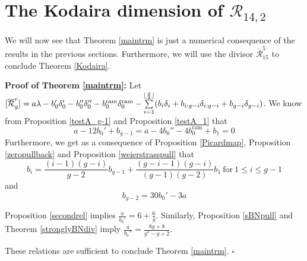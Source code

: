\documentclass{article}
\DeclarePairedDelimiter\floor{\lfloor}{\rfloor}
\theoremstyle{plain}
\newtheorem{cor}[trm]{Corollary}
\theoremstyle{definition}
\def\cM{\mathcal{M}}
\def\cR{\mathcal{R}}
\def\rr{\overline{\mathcal{R}}}
\begin{document}


\section{The Kodaira dimension of $\cR_{14,2}$} 

We will now see that Theorem \ref{maintrm} is just a numerical consequence of the results in the previous sections. Furthermore, we will use the divisor $\rr^5_{15}$ to conclude Theorem \ref{Kodaira}. 

\textbf{Proof of Theorem \ref{maintrm}:}
Let $[\rr^r_g] = a\lambda - b_0'\delta_0'- b_0''\delta_0''-b_0^{\mathrm{ram}}\delta_0^{\mathrm{ram}} - \sum\limits_{i=1}^{\floor{\frac{g}{2}}} (b_i\delta_i + b_{i:g-i} \delta_{i:g-i} + b_{g-i}\delta_{g-i})$. We know from Proposition \ref{testA_g-1} and Proposition \ref{testA_1} that
\[ a-12b_0'+b_{g-1}= a-4b_0'' - 4b_0^{\mathrm{ram}} + b_1 = 0 \]
Furthermore, we get as a consequence of Proposition \ref{Picardmap}, Proposition \ref{zeropullback} and Proposition \ref{weierstrasspull} that
\[ b_i = \frac{(i-1)(g-i)}{g-2}b_{g-1} + \frac{(g-i-1)(g-i)}{(g-1)(g-2)}b_1 \ \textrm{for} \ 1\leq i\leq g-1 \]
and
\[ b_{g-2} = 30b_0'-3a\]

Proposition \ref{secondrel} implies $\frac{a}{b_0'} = 6 + \frac{6}{g}$. Similarly, Proposition \ref{sBNpull} and Theorem \ref{stronglyBNdiv} imply $\frac{a}{b_0''} = \frac{8g+8}{g^2-g+2}$. 

These relations are sufficient to conclude Theorem \ref{maintrm}. \hfill $\square$
\end{document}
